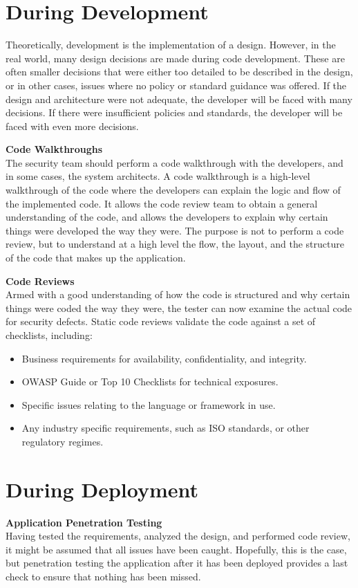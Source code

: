 	\section{During Development} 
		Theoretically, development is the implementation of a design. However, in the real world, many 
		design decisions are made during code development. These are often smaller decisions that were 
		either too detailed to be described in the design, or in other cases, issues where no policy or 
		standard guidance was offered. If the design and architecture were not adequate, the developer 
		will be faced with many decisions. If there were insufficient policies and standards, the 
		developer will be faced with even more decisions.
		
		{\bf Code Walkthroughs} \\
		The security team should perform a code walkthrough with the developers, and in some cases, the 
		system architects. A code walkthrough is a high-level walkthrough of the code where the developers 
		can explain the logic and flow of the implemented code. It allows the code review team to obtain 
		a general understanding of the code, and allows the developers to explain why certain things were 
		developed the way they were. The purpose is not to perform a code review, but to understand at a 
		high level the flow, the layout, and the structure of the code that makes up the application.
		
		{\bf Code Reviews} \\
		Armed with a good understanding of how the code is structured and why certain things were coded 
		the way they were, the tester can now examine the actual code for security defects.
		Static code reviews validate the code against a set of checklists, including:
			\begin{itemize}
				\item Business requirements for availability, confidentiality, and integrity.
				\item OWASP Guide or Top 10 Checklists for technical exposures.
				\item Specific issues relating to the language or framework in use.
				\item Any industry specific requirements, such as ISO standards, or other regulatory regimes.
			\end{itemize}


	\section{During Deployment}
		{\bf Application Penetration Testing} \\
		Having tested the requirements, analyzed the design, and performed code review, it might be 
		assumed that all issues have been caught. Hopefully, this is the case, but penetration testing 
		the application after it has been deployed provides a last check to ensure that nothing has 
		been missed.
		
